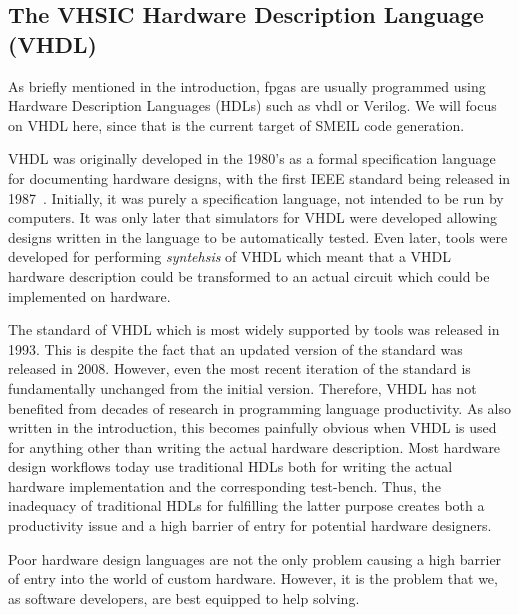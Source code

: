 \subsection{The VHSIC Hardware Description Language (VHDL)}
As briefly mentioned in the introduction, \glspl{fpga} are usually programmed
using Hardware Description Languages (HDLs) such as \gls{vhdl} or Verilog. We
will focus on VHDL here, since that is the current target of SMEIL code
generation.

VHDL was originally developed in the 1980's as a formal specification language
for documenting hardware designs, with the first IEEE standard being released in
1987~\cite{ashenden2001vhdl}. Initially, it was purely a specification language,
not intended to be run by computers. It was only later that simulators for VHDL
were developed allowing designs written in the language to be automatically
tested. Even later, tools were developed for performing {\it syntehsis} of VHDL
which meant that a VHDL hardware description could be transformed to an actual
circuit which could be implemented on hardware.

The standard of VHDL which is most widely supported by tools was released in
1993. This is despite the fact that an updated version of the standard was
released in 2008. However, even the most recent iteration of the standard is
fundamentally unchanged from the initial version. Therefore, VHDL has not
benefited from decades of research in programming language productivity. As also
written in the introduction, this becomes painfully obvious when VHDL is used
for anything other than writing the actual hardware description. Most hardware
design workflows today use traditional HDLs both for writing the actual hardware
implementation and the corresponding test-bench. Thus, the inadequacy of
traditional HDLs for fulfilling the latter purpose creates both a productivity
issue and a high barrier of entry for potential hardware designers.

Poor hardware design languages are not the only problem causing a high barrier
of entry into the world of custom hardware. However, it is the problem that we,
as software developers, are best equipped to help solving.



